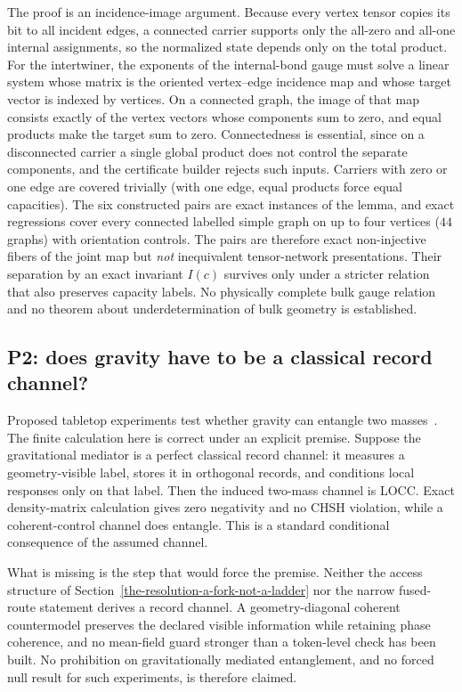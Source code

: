 The proof is an incidence-image argument. Because every vertex tensor copies its bit to all incident edges, a
connected carrier supports only the all-zero and all-one internal assignments, so the normalized state depends only on
the total product. For the intertwiner, the exponents of the internal-bond gauge must solve a linear system whose matrix is
the oriented vertex--edge incidence map and whose target vector is indexed by vertices. On a connected graph, the image
of that map consists exactly of the vertex vectors whose components sum to zero, and equal products make the target sum
to zero. Connectedness is essential, since on a
disconnected carrier a single global product does not control the separate components, and the certificate builder
rejects such inputs. Carriers with zero or one edge are covered trivially (with one edge, equal products force equal
capacities). The six constructed pairs are exact instances of the lemma, and exact regressions cover every connected
labelled simple graph on up to four vertices (\(44\) graphs) with orientation controls. The pairs are therefore exact
non-injective fibers of the joint map but \emph{not} inequivalent tensor-network presentations. Their separation by an
exact invariant \(I(c)\) survives only under a stricter relation that also preserves capacity labels. No physically
complete bulk gauge relation and no theorem about underdetermination of bulk geometry is established.

\subsection{P2: does gravity have to be a classical record channel?}\label{bmv-conditional-statement}

Proposed tabletop experiments test whether gravity can entangle two masses~\citep{Bose2017,MarlettoVedral2017}. The
finite calculation here is correct under an explicit premise. Suppose the gravitational mediator is a perfect classical
record channel: it measures a geometry-visible label, stores it in orthogonal records, and conditions local responses
only on that label. Then the induced two-mass channel is LOCC. Exact density-matrix calculation gives zero negativity
and no CHSH violation, while a coherent-control channel does entangle. This is a standard conditional consequence of the
assumed channel.

What is missing is the step that would force the premise. Neither the access structure of
Section~\ref{the-resolution-a-fork-not-a-ladder} nor the narrow fused-route statement derives a record channel. A
geometry-diagonal coherent countermodel preserves the declared visible information while retaining phase coherence,
and no mean-field guard stronger than a token-level check has been built. No prohibition on gravitationally mediated
entanglement, and no forced null result for such experiments, is therefore claimed.

